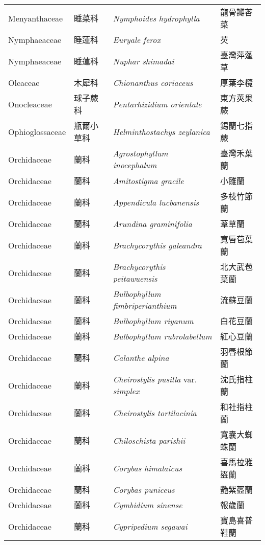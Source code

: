 \begin{longtable}{p{3cm}p{2cm}p{5cm}p{3cm}}
    Menyanthaceae & 睡菜科 & \textit{Nymphoides hydrophylla}  & 龍骨瓣莕菜\\
    Nymphaeaceae & 睡蓮科 & \textit{Euryale ferox}  & 芡\\
    Nymphaeaceae & 睡蓮科 & \textit{Nuphar shimadai}  & 臺灣萍蓬草\\
    Oleaceae & 木犀科 & \textit{Chionanthus coriaceus}  & 厚葉李欖\\
    Onocleaceae & 球子蕨科 & \textit{Pentarhizidium orientale}  & 東方莢果蕨\\
    Ophioglossaceae & 瓶爾小草科 & \textit{Helminthostachys zeylanica}  & 錫蘭七指蕨\\
    Orchidaceae & 蘭科 & \textit{Agrostophyllum inocephalum}  & 臺灣禾葉蘭\\
    Orchidaceae & 蘭科 & \textit{Amitostigma gracile}  & 小雛蘭\\
    Orchidaceae & 蘭科 & \textit{Appendicula lucbanensis}  & 多枝竹節蘭\\
    Orchidaceae & 蘭科 & \textit{Arundina graminifolia}  & 葦草蘭\\
    Orchidaceae & 蘭科 & \textit{Brachycorythis galeandra}  & 寬唇苞葉蘭\\
    Orchidaceae & 蘭科 & \textit{Brachycorythis peitawuensis}  & 北大武苞葉蘭\\
    Orchidaceae & 蘭科 & \textit{Bulbophyllum fimbriperianthium}  & 流蘇豆蘭\\
    Orchidaceae & 蘭科 & \textit{Bulbophyllum riyanum}  & 白花豆蘭\\
    Orchidaceae & 蘭科 & \textit{Bulbophyllum rubrolabellum}  & 紅心豆蘭\\
    Orchidaceae & 蘭科 & \textit{Calanthe alpina}  & 羽唇根節蘭\\
    Orchidaceae & 蘭科 & \textit{Cheirostylis pusilla} var. \textit{simplex}  & 沈氏指柱蘭\\
    Orchidaceae & 蘭科 & \textit{Cheirostylis tortilacinia}  & 和社指柱蘭\\
    Orchidaceae & 蘭科 & \textit{Chiloschista parishii}  & 寬囊大蜘蛛蘭\\
    Orchidaceae & 蘭科 & \textit{Corybas himalaicus}  & 喜馬拉雅盔蘭\\
    Orchidaceae & 蘭科 & \textit{Corybas puniceus}  & 艷紫盔蘭\\
    Orchidaceae & 蘭科 & \textit{Cymbidium sinense}  & 報歲蘭\\
    Orchidaceae & 蘭科 & \textit{Cypripedium segawai}  & 寶島喜普鞋蘭\\

\end{longtable}

